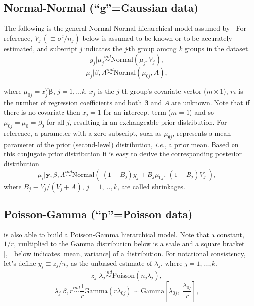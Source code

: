 \documentclass[article]{jss}
\begin{document}
\subsection[Normal-Normal]{Normal-Normal (``g''=Gaussian data)}
The following is the general Normal-Normal hierarchical model assumed by . For reference,  $V_{j}~(\equiv \sigma^{2}/n_{j})$ below is assumed to be known or to be accurately estimated, and subscript \emph{j} indicates the \emph{j}-th group among \emph{k} groups in the dataset.
\begin{equation}\label{normalobs}
y_{j}\vert \mu_{j} \stackrel{ind}{\sim}\textrm{Normal}(\mu_{j}, V_{j}),
\end{equation}
\begin{equation}\label{normalprior}
\mu_{j}\vert \beta, A\stackrel{ind}{\sim}\textrm{Normal}(\mu_{0j}, A),
\end{equation}

where $\mu_{0j} = x^{T}_{j} \mathbf{\beta}$, $j=1, \ldots k$, $x_{j}$ is the $j$-th group's covariate vector ($m\times 1$), $m$ is the number of regression coefficients and both $\mathbf{\beta}$ and $A$ are unknown. Note that if there is no covariate then $x_{j}=1$ for an intercept term ($m=1$) and so $\mu_{0j}=\mu_{0}=\beta_{0}$ for all $j$, resulting in an exchangeable prior distribution. For reference, a parameter with a zero subscript, such as $\mu_{0j}$, represents a mean parameter of the prior (second-level) distribution, \emph{i.e.}, a prior mean. Based on this conjugate prior distribution it is easy to derive the corresponding posterior distribution
\begin{equation} \label{normalpost}
\mu_{j}\vert \textbf{y}, \beta, A \stackrel{ind}{\sim}\textrm{Normal}(~(1-B_{j})y_{j} + B_{j}\mu_{0j},~(1-B_{j})V_{j}~),
\end{equation}
where $B_{j}\equiv V_{j}/(V_{j} + A),~j=1, \ldots, k$, are called shrinkages.

\subsection[Poisson-Gamma]{Poisson-Gamma (``p''=Poisson data)}\label{poissonsubsec}
 is also able to build a Poisson-Gamma hierarchical model. Note that a constant, $1/r$, multiplied to the Gamma distribution below is a scale and a square bracket [, ] below indicates [mean, variance] of a distribution. For notational consistency, let's define $y_{j}\equiv z_{j} / n_{j}$ as the unbiased estimate of $\lambda_{j}$, where $j=1, \ldots, k$.
\begin{equation}
z_{j}\vert \lambda_{j} \stackrel{ind}{\sim}\textrm{Poisson}(n_{j}\lambda_{j}),
\end{equation}
\begin{equation}\label{gammaprior}
\lambda_{j}\vert \beta, r\stackrel{ind}{\sim}\frac{1}{r}\textrm{Gamma}(r\lambda_{0j})\sim \textrm{Gamma} \left[\lambda_{0j}, ~\frac{\lambda_{0j}}{r} \right],
\end{equation}
\end{document}
